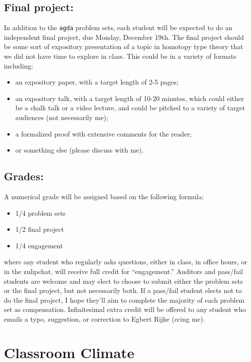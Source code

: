 \documentclass{amsart}
\theoremstyle{definition}
\theoremstyle{remark}
\numberwithin{equation}{section}
\begin{document}
\subsection*{Final project:}
In addition to the \texttt{agda} problem sets, each student will be expected to do an independent final project, due Monday, December 19th. The final project should be some sort of expository presentation of a topic in homotopy type theory that we did not have time to explore in class. This could be in a variety of formats including:
\begin{itemize}
\item an expository paper, with a target length of 2-5 pages;
\item an expository talk, with a target length of 10-20 minutes, which could either be a chalk talk or a video lecture, and could be pitched to a variety of target audiences (not necessarily me);
\item a formalized proof with extensive comments for the reader;
\item or something else (please discuss with me).
\end{itemize}

\subsection*{Grades:}
A numerical grade will be assigned based on the following formula:
\begin{itemize}
\item 1/4 problem sets
\item 1/2 final project
\item 1/4 engagement
\end{itemize}
where any student who regularly asks questions, either in class, in office hours, or in the zulipchat, will receive full credit for ``engagement.'' Auditors and pass/fail students are welcome and may elect to choose to submit either the problem sets or the final project, but not necessarily both. If a pass/fail student elects not to do the final project, I hope they'll aim to complete the majority of each problem set as compensation. Infinitesimal extra credit will be offered to any student who emails a typo, suggestion, or correction to Egbert Rijke (ccing me).


\section*{Classroom Climate}
\end{document}
